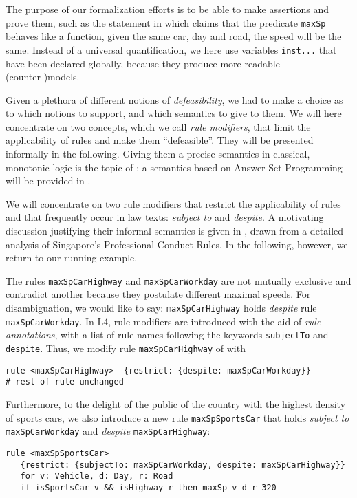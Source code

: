 The purpose of our formalization efforts is to be able to make assertions
and prove them, such as the statement in  which claims
that the predicate 
\texttt{maxSp} behaves like a function, \ie{} given the same car, day and
road, the speed will be the same. Instead of a universal quantification, we
here use variables \texttt{inst...} that have been declared globally, because they
produce more readable (counter-)models. 

Given a plethora of different notions of \emph{defeasibility}, we had to make a
choice as to which notions to support, and which semantics to give to them. We
will here concentrate on two concepts, which we call \emph{rule modifiers},
that limit the applicability of rules and make them ``defeasible''. They will
be presented informally in the following. Giving them a precise semantics in
classical, monotonic logic is the topic of ;
a semantics based on Answer Set Programming will be provided in
.

We will concentrate on two rule modifiers that restrict the applicability of
rules and that frequently occur in law texts: \emph{subject to} and
\emph{despite}. A motivating discussion justifying their informal semantics is
given in , drawn from a detailed
analysis of Singapore's Professional Conduct Rules. In the following, however,
we return to our running example.

\begin{example}
  The rules \texttt{maxSpCarHighway} and \texttt{maxSpCarWorkday} are not
  mutually exclusive and contradict another because they postulate different
  maximal speeds. For disambiguation, we would like to say:
  \texttt{maxSpCarHighway} holds \emph{despite} rule
  \texttt{maxSpCarWorkday}. In L4, rule modifiers are introduced with the aid
  of \emph{rule annotations}, with a list of rule names following the keywords
  \texttt{subjectTo} and \texttt{despite}. Thus, we modify rule
  \texttt{maxSpCarHighway} of  with
\begin{lstlisting}
rule <maxSpCarHighway>  {restrict: {despite: maxSpCarWorkday}}
# rest of rule unchanged
\end{lstlisting}
Furthermore, to the delight of the public of the country with the highest
density of sports cars, we also introduce a new rule \texttt{maxSpSportsCar}
that holds \emph{subject to} \texttt{maxSpCarWorkday} and \emph{despite}
\texttt{maxSpCarHighway}:
\begin{lstlisting}
rule <maxSpSportsCar>
   {restrict: {subjectTo: maxSpCarWorkday, despite: maxSpCarHighway}}
   for v: Vehicle, d: Day, r: Road
   if isSportsCar v && isHighway r then maxSp v d r 320
 \end{lstlisting}
\end{example}

